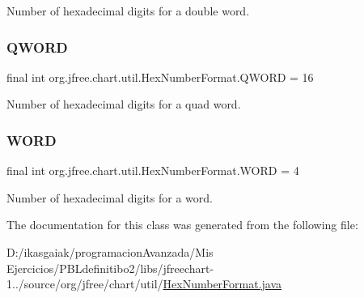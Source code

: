Number of hexadecimal digits for a double word. \mbox{\label{classorg_1_1jfree_1_1chart_1_1util_1_1_hex_number_format_a449224a5d7a7786945e434459d555a44}} 
\subsubsection{\texorpdfstring{Q\+W\+O\+RD}{QWORD}}
{\footnotesize\ttfamily final int org.\+jfree.\+chart.\+util.\+Hex\+Number\+Format.\+Q\+W\+O\+RD = 16\hspace{0.3cm}{\ttfamily [static]}}

Number of hexadecimal digits for a quad word. \mbox{\label{classorg_1_1jfree_1_1chart_1_1util_1_1_hex_number_format_a5fa5d3f24fe7f0a7aa1ef6e500d48551}} 
\subsubsection{\texorpdfstring{W\+O\+RD}{WORD}}
{\footnotesize\ttfamily final int org.\+jfree.\+chart.\+util.\+Hex\+Number\+Format.\+W\+O\+RD = 4\hspace{0.3cm}{\ttfamily [static]}}

Number of hexadecimal digits for a word. 

The documentation for this class was generated from the following file\+:\begin{DoxyCompactItemize}
\item 
D\+:/ikasgaiak/programacion\+Avanzada/\+Mis Ejercicios/\+P\+B\+Ldefinitibo2/libs/jfreechart-\/1../source/org/jfree/chart/util/\mbox{\hyperlink{_hex_number_format_8java}{Hex\+Number\+Format.\+java}}\end{DoxyCompactItemize}
